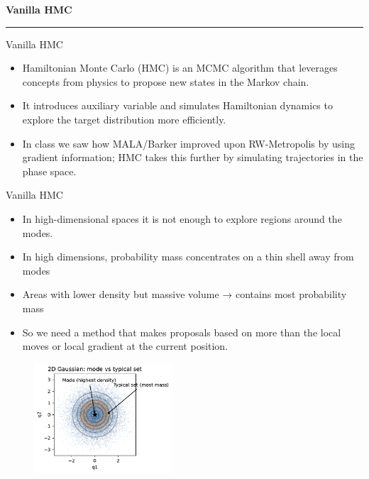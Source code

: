 \begin{frame}
	\vspace{2cm}
	\begin{center}
		{\Huge\textbf{\textcolor{copenhagenred}{Vanilla HMC}}}
		\vspace{1cm}

		\rule{4cm}{3pt}
		\vspace{2cm}
	\end{center}
\end{frame}

\begin{frame}{Vanilla HMC}
	\begin{itemize}
		\item Hamiltonian Monte Carlo (HMC) is an MCMC algorithm that leverages concepts from physics to propose new states in the Markov chain.
		\item It introduces auxiliary variable and simulates Hamiltonian dynamics to explore the target distribution more efficiently.
		\item In class we saw how MALA/Barker improved upon RW-Metropolis by using gradient information; HMC takes this further by simulating trajectories in the phase space.
	\end{itemize}
\end{frame}

\begin{frame}{Vanilla HMC}
	\begin{itemize}
		\item In high-dimensional spaces it is not enough to explore regions around the modes.
		\item In high dimensions, probability mass concentrates on a thin shell away from modes
		\item Areas with lower density but massive volume → contains most probability mass
		\item So we need a method that makes proposals based on more than the local moves or local gradient at the current position.
	\end{itemize}
	\begin{figure}
		\centering
		\includegraphics[width=0.46\textwidth]{mode_vs_typical_set.pdf} 
	\end{figure}
\end{frame}

